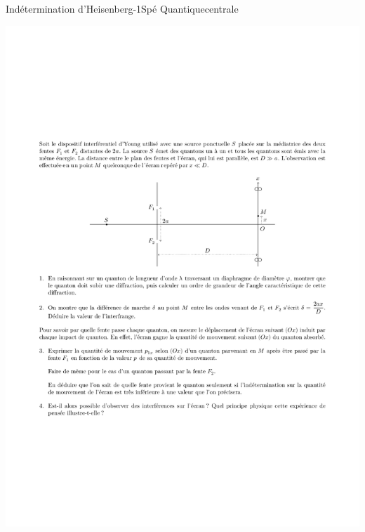 \begin{exercise}{Indétermination d'Heisenberg}{-1}{Spé}
{Quantique}{centrale}


\includegraphics[width=\linewidth]{oraux/centrale/heisenberg1.pdf}


\end{exercise}
